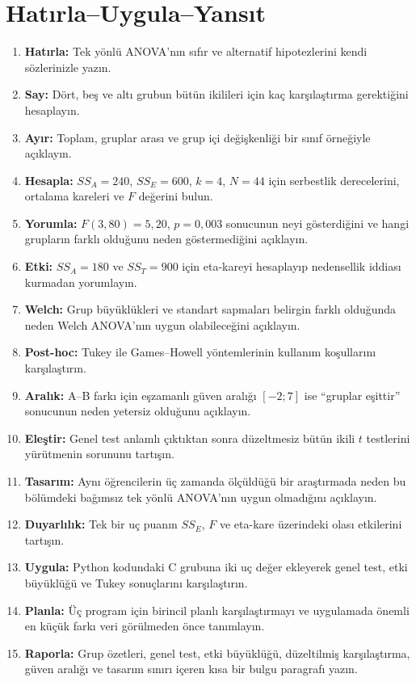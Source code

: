 


\section*{Hatırla--Uygula--Yansıt}

\begin{enumerate}
\renewcommand{\labelenumi}{\textbf{\Alph{enumi}.}}
  \item \textbf{Hatırla:} Tek yönlü ANOVA'nın sıfır ve alternatif hipotezlerini kendi sözlerinizle yazın.
  \item \textbf{Say:} Dört, beş ve altı grubun bütün ikilileri için kaç karşılaştırma gerektiğini hesaplayın.
  \item \textbf{Ayır:} Toplam, gruplar arası ve grup içi değişkenliği bir sınıf örneğiyle açıklayın.
  \item \textbf{Hesapla:} $SS_A=240$, $SS_E=600$, $k=4$, $N=44$ için serbestlik derecelerini, ortalama kareleri ve $F$ değerini bulun.
  \item \textbf{Yorumla:} $F(3,80)=5{,}20$, $p=0{,}003$ sonucunun neyi gösterdiğini ve hangi grupların farklı olduğunu neden göstermediğini açıklayın.
  \item \textbf{Etki:} $SS_A=180$ ve $SS_T=900$ için eta-kareyi hesaplayıp nedensellik iddiası kurmadan yorumlayın.
  \item \textbf{Welch:} Grup büyüklükleri ve standart sapmaları belirgin farklı olduğunda neden Welch ANOVA'nın uygun olabileceğini açıklayın.
  \item \textbf{Post-hoc:} Tukey ile Games--Howell yöntemlerinin kullanım koşullarını karşılaştırın.
  \item \textbf{Aralık:} A--B farkı için eşzamanlı güven aralığı $[-2;7]$ ise ``gruplar eşittir'' sonucunun neden yetersiz olduğunu açıklayın.
  \item \textbf{Eleştir:} Genel test anlamlı çıktıktan sonra düzeltmesiz bütün ikili $t$ testlerini yürütmenin sorununu tartışın.
  \item \textbf{Tasarım:} Aynı öğrencilerin üç zamanda ölçüldüğü bir araştırmada neden bu bölümdeki bağımsız tek yönlü ANOVA'nın uygun olmadığını açıklayın.
  \item \textbf{Duyarlılık:} Tek bir uç puanın $SS_E$, $F$ ve eta-kare üzerindeki olası etkilerini tartışın.
  \item \textbf{Uygula:} Python kodundaki C grubuna iki uç değer ekleyerek genel test, etki büyüklüğü ve Tukey sonuçlarını karşılaştırın.
  \item \textbf{Planla:} Üç program için birincil planlı karşılaştırmayı ve uygulamada önemli en küçük farkı veri görülmeden önce tanımlayın.
  \item \textbf{Raporla:} Grup özetleri, genel test, etki büyüklüğü, düzeltilmiş karşılaştırma, güven aralığı ve tasarım sınırı içeren kısa bir bulgu paragrafı yazın.
\end{enumerate}